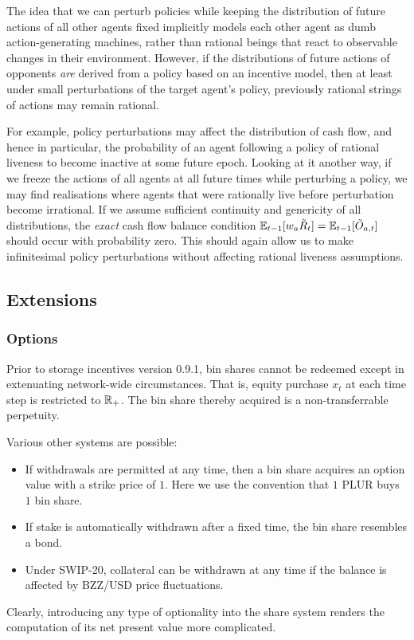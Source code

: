 \begin{remark}

  The idea that we can perturb policies while keeping the distribution of future actions of all other agents fixed implicitly models each other agent as dumb action-generating machines, rather than rational beings that react to observable changes in their environment.
  However, if the distributions of future actions of opponents \emph{are} derived from a policy based on an incentive model, then at least under small perturbations of the target agent's policy, previously rational strings of actions may remain rational.

  For example, policy perturbations may affect the distribution of cash flow, and hence in particular, the probability of an agent following a policy of rational liveness to become inactive at some future epoch.
  Looking at it another way, if we freeze the actions of all agents at all future times while perturbing a policy, we may find realisations where agents that were rationally live before perturbation become irrational.
  If we assume sufficient continuity and genericity of all distributions, the \emph{exact} cash flow balance condition $\mathbb{E}_{t-1}[w_a\tilde R_t]=\mathbb{E}_{t-1}[\tilde O_{a,t}]$ should occur with probability zero.
  This should again allow us to make infinitesimal policy perturbations without affecting rational liveness assumptions.

\end{remark}


\subsection{Extensions}
\subsubsection{Options}

Prior to storage incentives version 0.9.1, bin shares cannot be redeemed except in extenuating network-wide circumstances.
%
That is, equity purchase $x_t$ at each time step is restricted to $\mathbb{R}_+$.
%
The bin share thereby acquired is a non-transferrable perpetuity.

Various other systems are possible:
%
\begin{itemize}
  \item 
    If withdrawals are permitted at any time, then a bin share acquires an option value with a strike price of $1$.
    Here we use the convention that $1$ PLUR buys $1$ bin share.

  \item
    If stake is automatically withdrawn after a fixed time, the bin share resembles a bond.

  \item
    Under SWIP-20, collateral can be withdrawn at any time if the balance is affected by BZZ/USD  price fluctuations.
    
\end{itemize}
%
Clearly, introducing any type of optionality into the share system renders the computation of its net present value more complicated.

